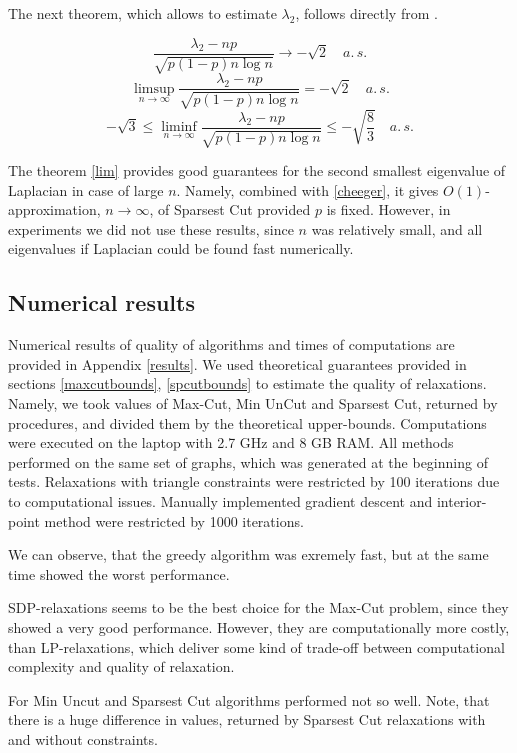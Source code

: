 \documentclass[12pt]{article}
\begin{document}
The next theorem, which allows to estimate $\lambda_2$, follows directly from 
\cite{jiang}.
\begin{Th}
	\label{lim}
	\[
		\frac{\lambda_2 - np}{\sqrt{p(1-p) n\log n}} \rightarrow -\sqrt2 \quad a.\, s.
	\]
	\[
		\limsup\limits_{n \rightarrow \infty} \frac{\lambda_2 - np}{\sqrt{p(1-p) n\log n}} = 
		-\sqrt2 \quad a.\, s.
	\]
	\[
		-\sqrt3 \leq \liminf\limits_{n \rightarrow \infty} \frac{\lambda_2 - np}{\sqrt{p(1-p) 
		n\log n}} \leq -\sqrt{\frac83} \quad a.\, s.
	\]
\end{Th}
The theorem \ref{lim} provides good guarantees for the second smallest eigenvalue of 
Laplacian in case of large $n$.
Namely, combined with \ref{cheeger}, it gives $O\left( 1 \right)$-approximation, $n 
\rightarrow \infty$, of Sparsest Cut provided $p$ is fixed.
However, in experiments we did not use these results, since $n$ was relatively small, 
and all eigenvalues if Laplacian could be found fast numerically.


\subsection{Numerical results}

Numerical results of quality of algorithms and times of computations are provided in 
Appendix \ref{results}.
We used theoretical guarantees provided in sections 
\ref{maxcutbounds}, \ref{spcutbounds} to estimate the quality of relaxations.
Namely, we took values of Max-Cut, Min UnCut and Sparsest Cut, returned by 
procedures, and divided them by the theoretical upper-bounds.
Computations were executed on the laptop with 2.7 GHz and 8 GB RAM.
All methods performed on the same set of graphs, which was generated at the beginning 
of tests.
Relaxations with triangle constraints were restricted by 100 iterations due to 
computational issues.
Manually implemented gradient descent and interior-point method were restricted by 
1000 iterations.

We can observe, that the greedy algorithm was exremely fast, but at the same time 
showed the worst performance.

SDP-relaxations seems to be the best choice for the Max-Cut problem, since they 
showed a very good performance.
However, they are computationally more costly, than LP-relaxations, which deliver some 
kind of trade-off between computational complexity and quality of relaxation.

For Min Uncut and Sparsest Cut algorithms performed not so well.
Note, that there is a huge difference in values, returned by Sparsest Cut relaxations with 
and without constraints.
\end{document}
